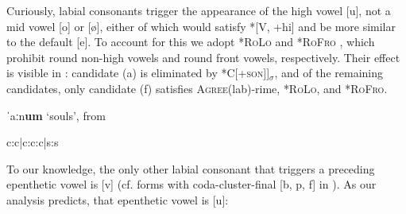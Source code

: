 \documentclass[output=paper,colorlinks,citecolor=brown]{langscibook}
\begin{document}
Curiously, labial consonants trigger the appearance of the high vowel [u], not a mid vowel [o] or [\o], either of which would satisfy *[V, +hi] and be more similar to the default [e].  To account for this we adopt \textsc{*RoLo} and \textsc{*RoFro} \citep{groundedphono, kaun, kaun:typology}, which prohibit round non-high vowels and round front vowels, respectively.  Their effect is visible in : candidate (a) is eliminated by \textsc{*C[+son]]$_\sigma$}, and of the remaining candidates, only candidate (f) satisfies \textsc{Agree}(lab)-rime, \textsc{*RoLo}, and \textsc{*RoFro}.

\begin{table}
\caption{ˈaːn\textbf{um} `souls', from }
\label{souls}
\begin{center}
\ShadingOn
\begin{tableau}{c:c|c:c:c|s:s} 
      \const*{\rotatebox{90}{\textsc{*C[+son]]$_\sigma$}}}       
               \vio{*!}     \vio{}  \vio{}    \vio{}                                    \vio{}     \vio{}  \vio{}
              \vio{}     \vio{}  \vio{*!}    \vio{}                                      \vio{}     \vio{}  \vio{}
               \vio{}     \vio{}  \vio{}    \vio{*!}                                    \vio{}     \vio{*}  \vio{}
              \vio{}     \vio{}  \vio{}    \vio{*!}                                      \vio{*!}     \vio{*}  \vio{}
              \vio{}     \vio{}  \vio{}    \vio{}                                      \vio{*!}     \vio{*}  \vio{*}
    \vio{}      \vio{}  \vio{}     \vio{}
                             \vio{}     \vio{*}  \vio{*}     
\end{tableau}
\end{center}
\end{table}

To our knowledge, the only other labial consonant that triggers a preceding epenthetic vowel is [v] (cf. forms with coda-cluster-final [b, p, f] in ).  As our analysis predicts, that epenthetic vowel is [u]:
\end{document}
